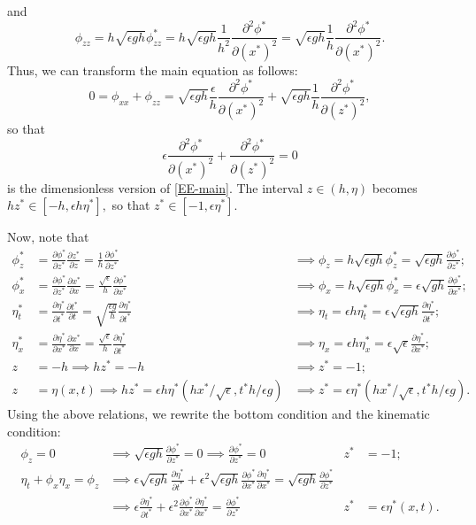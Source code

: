 \documentclass[10pt,reqno,oneside,a4paper]{article}
\begin{document}
and
\[ 
\phi_{zz} = h\sqrt{\epsilon g h} \phi^*_{zz} = h\sqrt{\epsilon g h} \frac{1}{h^2}\frac{\partial^2 \phi^*}{\partial (x^*)^2}  = \sqrt{\epsilon g h} \frac{1}{h}\frac{\partial^2 \phi^*}{\partial (x^*)^2}. 
\]
Thus, we can transform the main equation as follows:
\[ 
0 = \phi_{xx} + \phi_{zz} =  \sqrt{\epsilon g h} \frac{\epsilon}{h}\frac{\partial^2 \phi^*}{\partial (x^*)^2} + \sqrt{\epsilon g h} \frac{1}{h}\frac{\partial^2 \phi^*}{\partial (z^*)^2},
\]
so that 
\[ 
\epsilon \frac{\partial^2 \phi^*}{\partial (x^*)^2}  + \frac{\partial^2 \phi^*}{\partial (z^*)^2} = 0
\]
is the dimensionless version of \eqref{EE-main}. The interval $z \in (h, \eta)$ becomes $hz^* \in [-h, \epsilon h \eta^*],$ so that $z^* \in [-1, \epsilon \eta^*].$

Now, note that 
\begin{align*}
\phi^*_z &= \frac{\partial \phi^*}{\partial z^*} \frac{\partial z^*}{\partial z} = \frac{1}{h} \frac{\partial \phi^*}{\partial z^*} &\implies \phi_z = h\sqrt{\epsilon g h}\phi^*_z = \sqrt{\epsilon g h} \frac{\partial \phi^*}{\partial z^*}; \\
\phi^*_x &= \frac{\partial \phi^*}{\partial z^*} \frac{\partial x^*}{\partial x} = \frac{\sqrt{\epsilon}}{h} \frac{\partial \phi^*}{\partial x^*} &\implies \phi_x = h\sqrt{\epsilon g h}\phi^*_x = \epsilon\sqrt{g h} \frac{\partial \phi^*}{\partial x^*};\\
\eta^*_t &= \frac{\partial \eta^*}{\partial t^*} \frac{\partial t^*}{\partial t} = \sqrt{\frac{\epsilon g}{h}} \frac{\partial \eta^*}{\partial t^*} &\implies \eta_t = \epsilon h \eta^*_t = \epsilon \sqrt{\epsilon g h} \frac{\partial \eta^*}{\partial t^*};\\
\eta^*_x &= \frac{\partial \eta^*}{\partial x^*} \frac{\partial x^*}{\partial x} = \frac{\sqrt{\epsilon}}{h} \frac{\partial \eta^*}{\partial t^*} &\implies \eta_x = \epsilon h \eta^*_x = \epsilon \sqrt{\epsilon} \frac{\partial \eta^*}{\partial x^*}; \\
z& = -h \implies hz^*= - h &\implies z^* = -1;\\
z& = \eta(x,t) \implies hz^* = \epsilon h \eta^*(hx^*/\sqrt{\epsilon}, t^* h / \epsilon g) &\implies z^* = \epsilon \eta^*(hx^*/\sqrt{\epsilon}, t^* h / \epsilon g).
\end{align*}
Using the above relations, we rewrite the bottom condition and the kinematic condition:
\begin{align*}
\phi_z = 0 &\implies \sqrt{\epsilon g h} \frac{\partial \phi^*}{\partial z^*} = 0 \implies \frac{\partial \phi^*}{\partial z^*} = 0 &z^* &= -1; \\
\eta_t + \phi_x \eta_x = \phi_z &\implies  \epsilon \sqrt{\epsilon g h} \frac{\partial \eta^*}{\partial t^*} + \epsilon^2 \sqrt{\epsilon g h} \frac{\partial \phi^*}{\partial x^*} \frac{\partial \eta^*}{\partial x^*} = \sqrt{\epsilon g h} \frac{\partial \phi^*}{\partial z^*} \\
&\implies  \epsilon \frac{\partial \eta^*}{\partial t^*} + \epsilon^2 \frac{\partial \phi^*}{\partial x^*} \frac{\partial \eta^*}{\partial x^*} =  \frac{\partial \phi^*}{\partial z^*}  &z^* &= \epsilon\eta^*(x,t).
\end{align*}
\end{document}
